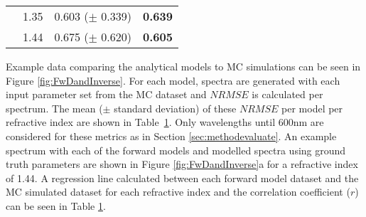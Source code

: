 \begin{table}[bhp]
\begin{tabular}{|c|c|c|c|}
        & 1.35 & 0.603 ($\pm$ 0.339) & \textbf{0.639} \\
        & 1.44 & 0.675 ($\pm$ 0.620) & \textbf{0.605} \\
        \hline
    \end{tabular}
    \label{tb:NRMSEsingle}
\end{table}

Example data comparing the analytical models to MC simulations can be seen in Figure \ref{fig:FwDandInverse}.
For each model, spectra are generated with each
input
parameter set from the MC dataset and $NRMSE$ is calculated per spectrum. The mean ($\pm$ standard deviation) of these $NRMSE$ per model per refractive index are shown in Table~\ref{tb:NRMSEsingle}.
Only wavelengths until 600nm are considered for these metrics as in Section \ref{sec:methodevaluate}. An example spectrum with each of the forward models and modelled spectra using ground truth parameters are shown in Figure \ref{fig:FwDandInverse}a for a refractive index of 1.44. A regression line calculated between each forward model dataset and the MC simulated dataset for each refractive index and the correlation coefficient ($r$) can be seen in Table \ref{tb:NRMSEsingle}.

